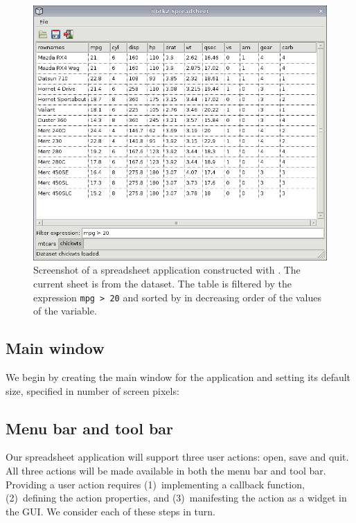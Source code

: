 \documentclass[article,shortnames]{jss}
\begin{document}
\begin{figure}[h!tbp]
\begin{center}
\includegraphics[width=6in]{spreadsheet.png}
\caption{\label{fig:spreadsheet}Screenshot of a spreadsheet
  application constructed with . The current sheet is from
the
   dataset. The table is filtered by the expression
  \texttt{mpg > 20} and sorted by in decreasing order of the values of
the  variable.}
\end{center}
\end{figure}

\subsection{Main window}

We begin by creating the main window for the application and setting
its default size, specified in number of screen pixels:

\subsection{Menu bar and tool bar}
\label{sec:spreadsheet-menubar}

Our spreadsheet application will support three user actions: open, save and quit. All three actions will be made available in both the menu bar and tool bar. Providing a user action requires (1)~implementing a callback function, (2)~defining the action properties, and (3)~manifesting the action as a widget in the GUI. We consider each of these steps in turn.
\end{document}
